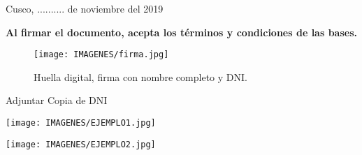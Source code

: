 \documentclass{article}
\begin{document}
Cusco, .......... de noviembre del 2019




\textbf{Al firmar el documento, acepta los términos y condiciones de las bases.}

\begin{figure}[hbtp]
\centering
\texttt{[image: IMAGENES/firma.jpg]}
\caption{Huella digital, firma con nombre completo y DNI. }
\end{figure}

Adjuntar Copia de DNI

\newpage

\texttt{[image: IMAGENES/EJEMPLO1.jpg]} 

\texttt{[image: IMAGENES/EJEMPLO2.jpg]}
\end{document}
